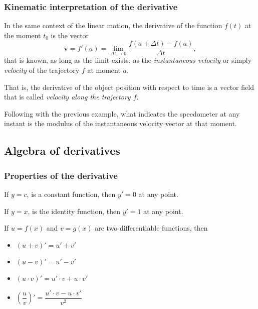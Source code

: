 \begin{frame}
	\frametitle{Kinematic interpretation of the derivative}
	In the same context of the linear motion, the derivative of the function $f(t)$ at the moment $t_0$ is the vector
	\[
		\mathbf{v}=f'(a)=\lim_{\Delta t\rightarrow 0}\frac{f(a+\Delta t)-f(a)}{\Delta t},
	\]
	that is known, as long as the limit exists, as the \emph{instantaneous velocity} or simply \emph{velocity} of the trajectory $f$ at moment $a$.
	
	That is, the derivative of the object position with respect to time is a vector field that is called \emph{velocity along the trajectory $f$}.
	
	Following with the previous example, what indicates the speedometer at any instant is the modulus of the instantaneous velocity vector at that moment.
\end{frame}


\subsection{Algebra of derivatives}
\begin{frame}
	\frametitle{Properties of the derivative}
	If $y=c$, is a constant function, then $y'=0$ at any point.
	
	If $y=x$, is the identity function, then  $y'=1$ at any point.
	
	If $u=f(x)$ and $v=g(x)$ are two differentiable functions, then 
	\begin{itemize}
		\item $(u+v)'=u'+v'$
		\item $(u-v)'=u'-v'$
		\item $(u\cdot v)'=u'\cdot v+ u\cdot v'$
		\item $\left(\dfrac{u}{v}\right)'=\dfrac{u'\cdot v-u\cdot v'}{v^2}$
	\end{itemize}
\end{frame}


